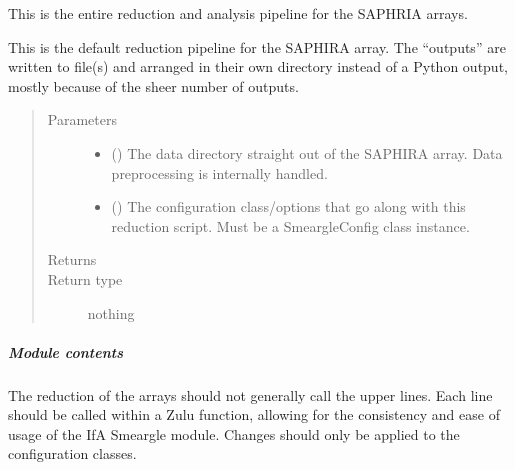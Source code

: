 \documentclass[letterpaper,10pt,english]{sphinxmanual}
\begin{document}
\begin{fulllineitems}
\label{\detokenize{python_docstrings/IfA_Smeargle.zulu.detector_pipelines.saphira_pipeline:IfA_Smeargle.zulu.detector_pipelines.saphira_pipeline.saphira_reduction_pipeline}}
This is the entire reduction and analysis pipeline for the SAPHRIA
arrays.

This is the default reduction pipeline for the SAPHIRA array. The
“outputs” are written to file(s) and arranged in their own directory
instead of a Python output, mostly because of the sheer number of outputs.
\begin{quote}\begin{description}
\item[{Parameters}] \leavevmode\begin{itemize}
\item {} 
 () \textendash{} The data directory straight out of the SAPHIRA array. Data
preprocessing is internally handled.

\item {} 
 () \textendash{} The configuration class/options that go along with this reduction
script. Must be a SmeargleConfig class instance.

\end{itemize}

\item[{Returns}] \leavevmode


\item[{Return type}] \leavevmode
nothing

\end{description}\end{quote}

\end{fulllineitems}



\subparagraph{Module contents}
\label{\detokenize{python_docstrings/IfA_Smeargle.zulu.detector_pipelines:module-IfA_Smeargle.zulu.detector_pipelines}}\label{\detokenize{python_docstrings/IfA_Smeargle.zulu.detector_pipelines:module-contents}}
The reduction of the arrays should not generally call the upper lines.
Each line should be called within a Zulu function, allowing for the
consistency and ease of usage of the IfA Smeargle module. Changes should
only be applied to the configuration classes.
\end{document}

